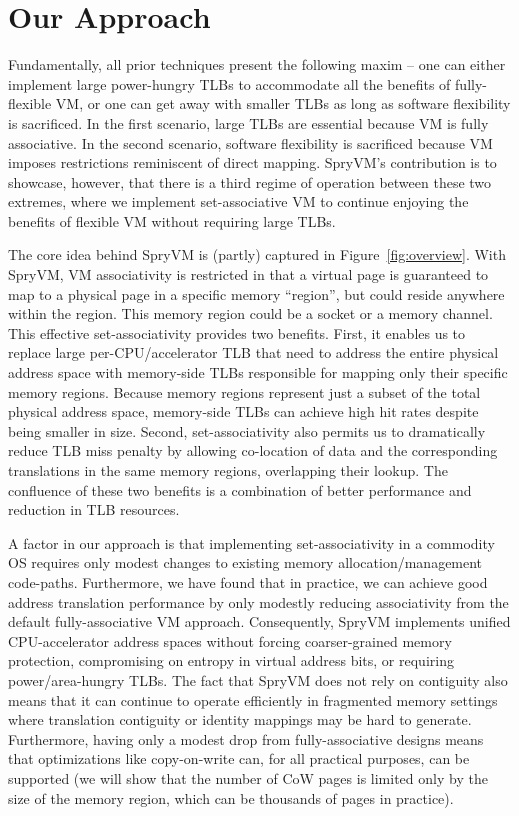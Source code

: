 \section{Our Approach}\label{our-approach}
Fundamentally, all prior techniques present the following maxim -- one
can either implement large power-hungry TLBs to accommodate all the
benefits of fully-flexible VM, or one can get away with smaller TLBs
as long as software flexibility is sacrificed. In the first scenario,
large TLBs are essential because VM is fully associative. In the
second scenario, software flexibility is sacrificed because VM imposes
restrictions reminiscent of direct mapping. SpryVM's contribution is
to showcase, however, that there is a third regime of operation
between these two extremes, where we implement set-associative VM to
continue enjoying the benefits of flexible VM without requiring large
TLBs. 

The core idea behind SpryVM is (partly) captured in Figure~\ref{fig:overview}. With
SpryVM, VM associativity is restricted in that a virtual page is
guaranteed to map to a physical page in a specific memory
``region'', but could reside anywhere within the region. This memory region could be a socket or a memory
channel. This effective set-associativity provides two
benefits. First, it enables us to replace large per-CPU/accelerator
TLB that need to address the entire physical address space with
memory-side TLBs responsible for mapping only their specific memory
regions. Because memory regions represent just a subset of the total
physical address space, memory-side TLBs can achieve high hit rates
despite being smaller in size. Second, set-associativity also permits
us to dramatically reduce TLB miss penalty by allowing co-location of data and
the corresponding translations in the same memory regions, overlapping their
lookup. The confluence of these two benefits is a combination of
better performance and reduction in TLB resources. 

A factor in our approach is that implementing set-associativity in a
commodity OS requires only modest changes to existing memory
allocation/management code-paths. Furthermore, we have found that in
practice, we can achieve good address translation performance by only
modestly reducing associativity from the default fully-associative VM
approach. Consequently, SpryVM implements unified CPU-accelerator
address spaces without forcing coarser-grained memory protection,
compromising on entropy in virtual address bits, or requiring
power/area-hungry TLBs. The fact that SpryVM does not rely on
contiguity also means that it can continue to operate efficiently in
fragmented memory settings where translation contiguity or identity
mappings may be hard to generate. Furthermore, having only a modest drop
from fully-associative designs means that optimizations like
copy-on-write can, for all practical purposes, can be supported (we will
show that the number of CoW pages is limited only by the size of the
memory region, which can be thousands of pages in practice).


